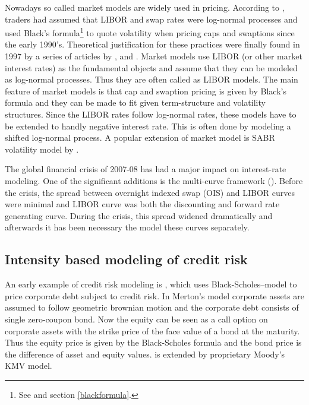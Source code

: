 Nowadays so called market models are widely used in pricing. According to \textcite[p. 182]{wu2009interest}, traders had assumed that LIBOR and swap rates were log-normal processes and used Black's formula\footnote{See \textcite{black1976pricing} and section \ref{blackformula}.} to quote volatility when pricing caps and swaptions since the early 1990's. Theoretical justification for these practices were finally found in 1997 by a series of articles by \cite{bracegatarek1997market}, \textcite{miltersen1997closed} and \textcite{jamshidian1997libor}. Market models use LIBOR (or other market interest rates) as the fundamental objects and assume that they can be modeled as log-normal processes. Thus they are often called as LIBOR models. The main feature of market models is that cap and swaption pricing is given by Black's formula and they can be made to fit given term-structure and volatility structures. Since the LIBOR rates follow log-normal rates, these models have to be extended to handly negative interest rate. This is often done by modeling a shifted log-normal process. A popular extension of market model is SABR volatility model by \textcite{hagan2002managing}.

The global financial crisis of 2007-08 has had a major impact on interest-rate modeling. One of the significant additions is the multi-curve framework (\textcite{mercurio2009interest}). Before the crisis, the spread between overnight indexed swap (OIS) and LIBOR curves were minimal and LIBOR curve was both the discounting and forward rate generating curve. During the crisis, this spread widened dramatically and afterwards it has been necessary the model these curves separately. 

\subsection{Intensity based modeling of credit risk}

An early example of credit risk modeling is \textcite{merton1974pricing}, which uses Black-Scholes--model to price corporate debt subject to credit risk. In Merton's model corporate assets are assumed to follow geometric brownian motion and the corporate debt consists of single zero-coupon bond. Now the equity can be seen as a call option on corporate assets with the strike price of the face value of a bond at the maturity. Thus the equity price is given by the Black-Scholes formula and the bond price is the difference of asset and equity values. \textcite{merton1974pricing} is extended by proprietary Moody's KMV model. 

